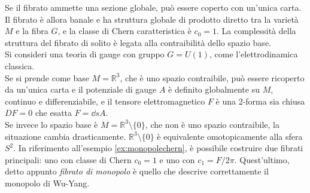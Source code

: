 Se il fibrato ammette una sezione globale, può essere coperto con un'unica carta.
Il fibrato è allora banale e ha struttura globale di prodotto diretto tra la
varietà $M$ e la fibra $G$, e la classe di Chern caratteristica è $c_0 = 1$.
La complessità della struttura del fibrato di solito è legata alla contraibilità
dello spazio base.\\

Si consideri una teoria di gauge con gruppo $G = U(1)$, come l'elettrodinamica classica.\\

Se si prende come base $M = \mathbb{R}^3$, che è uno spazio contraibile, può essere
ricoperto da un'unica carta e il potenziale di gauge $A$ è definito globalmente su $M$,
continuo e differenziabile, e il tensore elettromagnetico $F$ è una 2-forma
sia chiusa $DF = 0$ che esatta $F = \dd sA$.\\

Se invece lo spazio base è $M = \mathbb{R}^3 \setminus \{0\}$, che non è uno spazio
contraibile, la situazione cambia drasticamente. $\mathbb{R}^3 \setminus \{0\}$ è
equivalente omotopicamente alla sfera $S^2$.
In riferimento all'esempio \ref{ex:monopolechern}, è possibile costruire due fibrati
principali: uno con classe di Chern $c_0 = 1$ e uno con $c_1 = F/2\pi$. Quest'ultimo,
detto appunto \emph{fibrato di monopolo} è quello che descrive correttamente il
monopolo di Wu-Yang.
